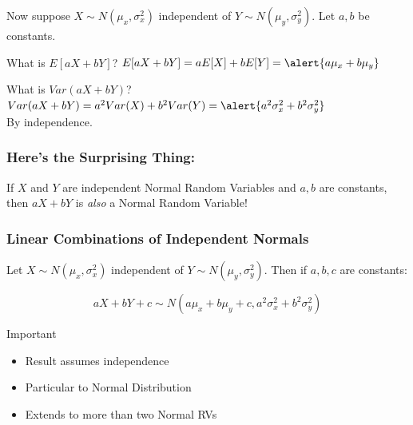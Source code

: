 \documentclass[handout]{beamer}
\begin{document}
\begin{frame}
Now suppose $X \sim N(\mu_x, \sigma^2_x)$ independent of $Y \sim N(\mu_y, \sigma^2_y)$. Let $a,b$ be constants.
\vspace{2em}

\begin{block}{What is $E[aX + bY]$?}
\pause
$E[aX + bY]=a E[X] + b E[Y] = \alert{a\mu_x + b\mu_y}$
\end{block}
\vspace{1em}

\begin{block}{What is $Var(aX + bY)$?}
\pause
$Var(aX + bY) = a^2 Var(X) + b^2 Var(Y) = \alert{a^2 \sigma_x^2 + b^2 \sigma_y^2}$
\\\alert{By independence.}
\end{block}
\end{frame}
\begin{frame}
\frametitle{Here's the Surprising Thing:}
\alert{If $X$ and $Y$ are independent Normal Random Variables and $a,b$ are constants, then $aX + bY$ is \emph{also} a Normal Random Variable!}
\end{frame}
\begin{frame}
\frametitle{Linear Combinations of Independent Normals}
Let $X \sim N(\mu_x, \sigma^2_x)$ independent of $Y \sim N(\mu_y, \sigma^2_y)$. Then if $a,b,c$ are constants:

$$\boxed{aX + bY +c \sim N(a\mu_x + b\mu_y + c, a^2 \sigma_x^2 + b^2 \sigma_y^2)}$$



\begin{block}{Important}
	\begin{itemize}
		\item Result assumes independence
		\item Particular to Normal Distribution
		\item Extends to more than two Normal RVs
	\end{itemize}
\end{block}

\end{frame}
\end{document}

